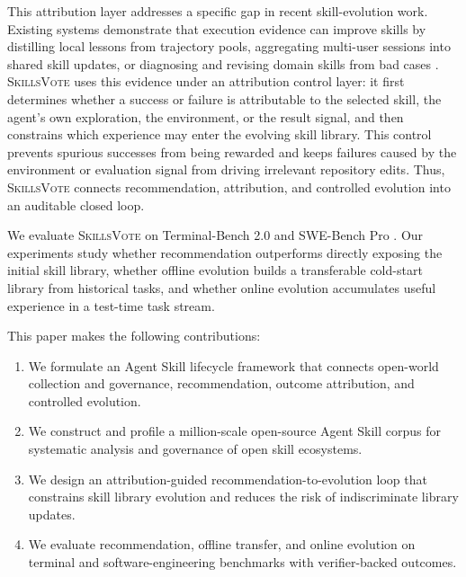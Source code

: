 \documentclass{llmxive}
\providecommand{\ours}{\textsc{SkillsVote}\xspace}
\begin{document}
This attribution layer addresses a specific gap in recent skill-evolution work. Existing systems demonstrate that execution evidence can improve skills by distilling local lessons from trajectory pools, aggregating multi-user sessions into shared skill updates, or diagnosing and revising domain skills from bad cases \citep{ni2026trace2skill,ma2026skillclaw,liu2026skillforge}. \ours uses this evidence under an attribution control layer: it first determines whether a success or failure is attributable to the selected skill, the agent's own exploration, the environment, or the result signal, and then constrains which experience may enter the evolving skill library. This control prevents spurious successes from being rewarded and keeps failures caused by the environment or evaluation signal from driving irrelevant repository edits. Thus, \ours connects recommendation, attribution, and controlled evolution into an auditable closed loop.

We evaluate \ours on Terminal-Bench 2.0 and SWE-Bench Pro \citep{merrill2026terminal,deng2025swe}. Our experiments study whether recommendation outperforms directly exposing the initial skill library, whether offline evolution builds a transferable cold-start library from historical tasks, and whether online evolution accumulates useful experience in a test-time task stream.

This paper makes the following contributions:
\begin{enumerate}
    \setlength{\itemsep}{0pt}
    \item We formulate an Agent Skill lifecycle framework that connects open-world collection and governance, recommendation, outcome attribution, and controlled evolution.
    \item We construct and profile a million-scale open-source Agent Skill corpus for systematic analysis and governance of open skill ecosystems.
    \item We design an attribution-guided recommendation-to-evolution loop that constrains skill library evolution and reduces the risk of indiscriminate library updates.
    \item We evaluate recommendation, offline transfer, and online evolution on terminal and software-engineering benchmarks with verifier-backed outcomes.
\end{enumerate}


\end{document}

